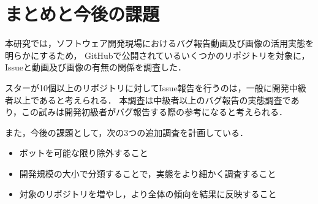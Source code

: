 \section{まとめと今後の課題\label{validity}}
本研究では，ソフトウェア開発現場におけるバグ報告動画及び画像の活用実態を明らかにするため，
GitHubで公開されているいくつかのリポジトリを対象に，Issueと動画及び画像の有無の関係を調査した．

スターが10個以上のリポジトリに対してIssue報告を行うのは，一般に開発中級者以上であると考えられる．
本調査は中級者以上のバグ報告の実態調査であり，この試みは開発初級者がバグ報告する際の参考になると考えられる．

また，今後の課題として，次の3つの追加調査を計画している．
\begin{itemize}
  \item ボットを可能な限り除外すること
  \item 開発規模の大小で分類することで，実態をより細かく調査すること
  \item 対象のリポジトリを増やし，より全体の傾向を結果に反映すること
\end{itemize}